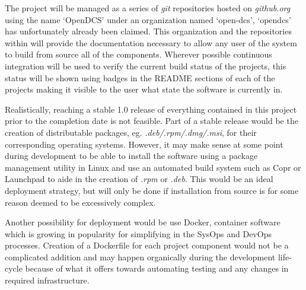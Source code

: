 \documentclass[11pt]{article}
\begin{document}
        The project will be managed as a series of \emph{git} repositories hosted
        on \emph{github.org} using the name `OpenDCS' under an organization named
        `open-dcs', `opendcs' has unfortunately already been claimed. This
        organization and the repositories within will provide the documentation
        necessary to allow any user of the system to build from source all of the
        components. Wherever possible continuous integration will be used to
        verify the current build status of the projects, this status will be shown
        using badges in the README sections of each of the projects making it
        visible to the user what state the software is currently in.

        Realistically, reaching a stable 1.0 release of everything contained in
        this project prior to the completion date is not feasible. Part of a
        stable release would be the creation of distributable packages, eg.
        \emph{.deb/.rpm/.dmg/.msi}, for their corresponding operating systems.
        However, it may make sense at some point during development to be able
        to install the software using a package management utility in Linux and use
        an automated build system such as Copr or Launchpad to aide in the creation
        of \emph{.rpm} or \emph{.deb}. This would be an ideal deployment strategy,
        but will only be done if installation from source is for some reason deemed
        to be excessively complex.

        Another possibility for deployment would be use Docker, container software
        which is growing in popularity for simplifying in the SysOps and DevOps
        processes. Creation of a Dockerfile for each project component would not
        be a complicated addition and may happen organically during the development
        life-cycle because of what it offers towards automating testing and any
        changes in required infrastructure.


\end{document}
